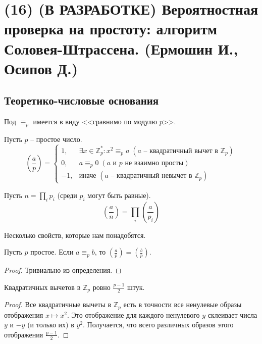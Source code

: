 \newcommand{\divisible}{\mathop{\raisebox{-2pt}{\vdots}}}
\section{(16) (В РАЗРАБОТКЕ) Вероятностная проверка на простоту: алгоритм Соловея-Штрассена. (Ермошин И., Осипов Д.)}

\subsection{Теоретико-числовые основания}
Под $\equiv_p$ имеется в виду <<сравнимо по модулю $p$>>.
\begin{definition*} Пусть $p$ -- простое число.
$$\left(\frac{a}{p}\right) = \begin{cases}
1,  & \exists x\in\mathbb{Z}_p^*: x^2\equiv_p a \; (a \text{~-- квадратичный вычет в } \mathbb Z_p)\\
0,  & a\equiv_p0 \; (a \text{ и } p \text{ не взаимно просты})\\
-1, & \text{иначе } (a \text{~-- квадратичный невычет в } \mathbb Z_p)
\end{cases}$$
\end{definition*}

\begin{definition*} Пусть $n = \prod_i p_i$ (среди $p_i$ могут быть равные).
$$\left(\frac{a}{n}\right)=\prod_i \left(\frac{a}{p_i}\right)$$
\end{definition*}

Несколько свойств, которые нам понадобятся.

\begin{lemma} \hypertarget{aequivb}{}
Пусть $p$ простое. Если $a \equiv_p b$, то $\left(\frac{a}{p}\right) = \left(\frac{b}{p}\right)$.
\end{lemma}
\begin{proof}
Тривиально из определения.
\end{proof}

\begin{lemma}\label{qresiduelemma} Квадратичных вычетов в $\mathbb Z_p$ ровно $\frac{p-1}{2}$ штук.
\end{lemma}
\begin{proof}
Все квадратичные вычеты в $\mathbb Z_p$ есть в точности все ненулевые образы отображения $x \mapsto x^2$. Это отображение для каждого ненулевого $y$ склеивает числа $y$ и $-y$ (и только их) в $y^2$. Получается, что всего различных образов этого отображения $\frac{p-1}{2}$.
\end{proof}


